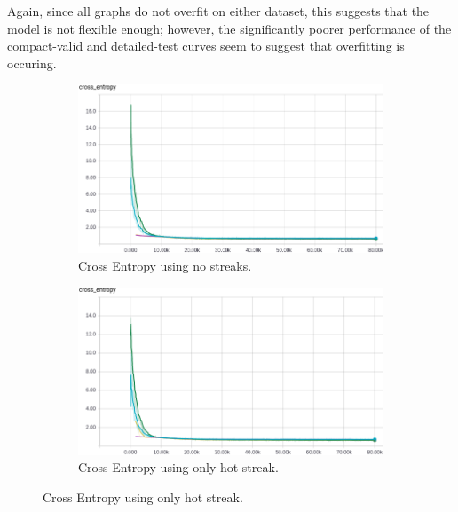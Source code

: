 \documentclass{article} %
\begin{document}
Again, since all graphs do not overfit on either dataset, this suggests that the model is not flexible enough; however, the significantly poorer performance of the compact-valid and detailed-test curves seem to suggest that overfitting is occuring.



\begin{figure}[!htb]
  \begin{subfigure}{0.5\textwidth}
    \includegraphics[width=\linewidth]{plots/model2/streak-/crossentropy.png}
    \caption{Cross Entropy using no streaks.}\label{fig:model2--crossentropy}
  \end{subfigure}
  \begin{subfigure}{0.5\textwidth}
    \includegraphics[width=\linewidth]{plots/model2/streak-h/crossentropy.png}
    \caption{Cross Entropy using only hot streak.}\label{fig:model2-h-crossentropy}
  \end{subfigure}



\end{figure}
\end{document}
